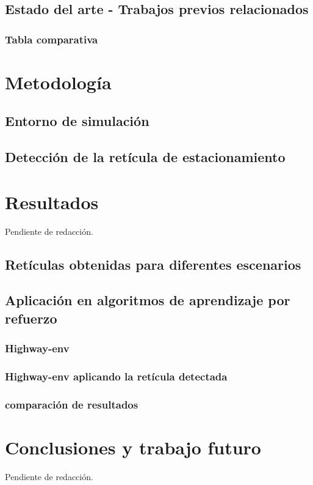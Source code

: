 \documentclass[10pt,letterpaper,final]{article}
\begin{document}
\subsection{Estado del arte - Trabajos previos relacionados}


\subsubsection{Tabla comparativa}



\clearpage
\section{Metodología}


\subsection{Entorno de simulación}


\subsection{Detección de la retícula de estacionamiento}


%

\clearpage
\section{Resultados}
Pendiente de redacción.
\subsection{Retículas obtenidas para diferentes escenarios}
\subsection{Aplicación en algoritmos de aprendizaje por refuerzo}
\subsubsection{Highway-env}
\subsubsection{Highway-env aplicando la retícula detectada}
\subsubsection{comparación de resultados}

\clearpage
\section{Conclusiones y trabajo futuro}
Pendiente de redacción.

\clearpage


\end{document}
